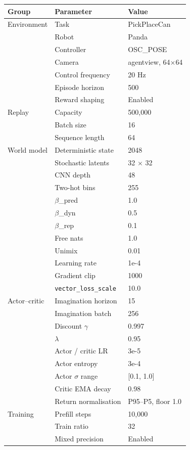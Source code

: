 \documentclass[12pt,a4paper,oneside]{report}
\begin{document}
\begin{longtable}[]{@{}lll@{}}
\toprule\noalign{}
Group & Parameter & Value \\
\midrule\noalign{}
\endhead
\bottomrule\noalign{}
\endlastfoot
Environment & Task & PickPlaceCan \\
& Robot & Panda \\
& Controller & OSC\_POSE \\
& Camera & agentview, 64$\times$64 \\
& Control frequency & 20 Hz \\
& Episode horizon & 500 \\
& Reward shaping & Enabled \\
Replay & Capacity & 500,000 \\
& Batch size & 16 \\
& Sequence length & 64 \\
World model & Deterministic state & 2048 \\
& Stochastic latents & 32 $\times$ 32 \\
& CNN depth & 48 \\
& Two-hot bins & 255 \\
& $\beta$\_pred & 1.0 \\
& $\beta$\_dyn & 0.5 \\
& $\beta$\_rep & 0.1 \\
& Free nats & 1.0 \\
& Unimix & 0.01 \\
& Learning rate & 1e-4 \\
& Gradient clip & 1000 \\
& \texttt{vector\_loss\_scale} & 10.0 \\
Actor--critic & Imagination horizon & 15 \\
& Imagination batch & 256 \\
& Discount $\gamma$ & 0.997 \\
& $\lambda$ & 0.95 \\
& Actor / critic LR & 3e-5 \\
& Actor entropy & 3e-4 \\
& Actor $\sigma$ range & {[}0.1, 1.0{]} \\
& Critic EMA decay & 0.98 \\
& Return normalisation & P95--P5, floor 1.0 \\
Training & Prefill steps & 10,000 \\
& Train ratio & 32 \\
& Mixed precision & Enabled \\
\end{longtable}
\end{document}
